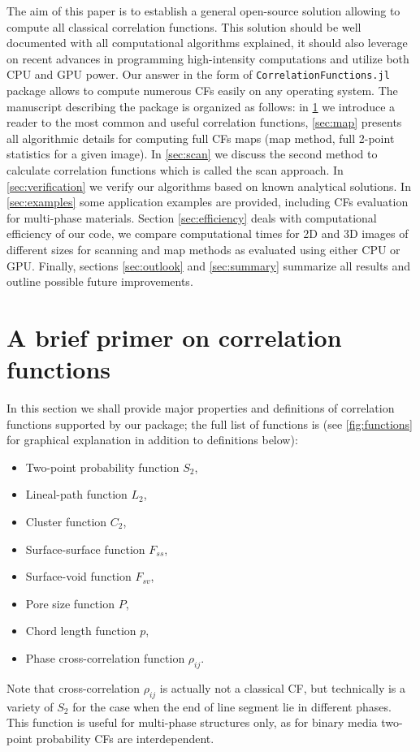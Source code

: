 \documentclass[1p]{elsarticle}
\newcommand{\code}[1]{\colorbox{light-gray}{\texttt{#1}}}
\begin{document}
The aim of this paper is to establish a general open-source solution allowing to
compute all classical correlation functions. This solution should be well
documented with all computational algorithms explained, it should also leverage
on recent advances in programming high-intensity computations and utilize both
CPU and GPU power. Our answer in the form of \code{CorrelationFunctions.jl}
package allows to compute numerous CFs easily on any operating system. The
manuscript describing the package is organized as follows: in \cref{sec:math} we
introduce a reader to the most common and useful correlation functions,
\cref{sec:map} presents all algorithmic details for computing full CFs maps (map
method, full 2-point statistics for a given image). In \cref{sec:scan} we
discuss the second method to calculate correlation functions which is called the
scan approach. In \cref{sec:verification} we verify our algorithms based on
known analytical solutions. In \cref{sec:examples} some application examples are
provided, including CFs evaluation for multi-phase materials. Section
\ref{sec:efficiency} deals with computational efficiency of our code, we compare
computational times for 2D and 3D images of different sizes for scanning and map
methods as evaluated using either CPU or GPU.  Finally, sections
\ref{sec:outlook} and \ref{sec:summary} summarize all results and outline
possible future improvements.

\section{A brief primer on correlation functions}
\label{sec:math}
In this section we shall provide major properties and definitions of correlation
functions supported by our package; the full list of functions is (see
\cref{fig:functions} for graphical explanation in addition to definitions
below):
\begin{itemize}
\item Two-point probability function $S_2$,
\item Lineal-path function $L_2$,
\item Cluster function $C_2$,
\item Surface-surface function $F_{ss}$,
\item Surface-void function $F_{sv}$,
\item Pore size function $P$,
\item Chord length function $p$,
\item Phase cross-correlation function $\rho_{ij}$.
\end{itemize}
Note that cross-correlation $\rho_{ij}$ is actually not a classical CF, but
technically is a variety of $S_2$ for the case when the end of line segment lie
in different phases. This function is useful for multi-phase structures only, as
for binary media two-point probability CFs are interdependent.
\end{document}
